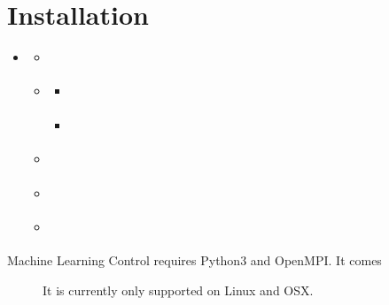 \documentclass[letterpaper,10pt,english]{sphinxmanual}
\begin{document}
\chapter{Installation}
\label{\detokenize{user/installation:installation}}\label{\detokenize{user/installation::doc}}
\begin{sphinxShadowBox}
\begin{itemize}
\item {} 
\label{\detokenize{user/installation:id1}}{\hyperref[\detokenize{user/installation:installation}]{}}
\begin{itemize}
\item {} 
\label{\detokenize{user/installation:id2}}{\hyperref[\detokenize{user/installation:installing-python}]{}}

\item {} 
\label{\detokenize{user/installation:id3}}{\hyperref[\detokenize{user/installation:installing-openmpi}]{}}
\begin{itemize}
\item {} 
\label{\detokenize{user/installation:id4}}{\hyperref[\detokenize{user/installation:ubuntu}]{}}

\item {} 
\label{\detokenize{user/installation:id5}}{\hyperref[\detokenize{user/installation:mac-os-x}]{}}

\end{itemize}

\item {} 
\label{\detokenize{user/installation:id6}}{\hyperref[\detokenize{user/installation:installing-spinning-up}]{}}

\item {} 
\label{\detokenize{user/installation:id7}}{\hyperref[\detokenize{user/installation:check-your-install}]{}}

\item {} 
\label{\detokenize{user/installation:id8}}{\hyperref[\detokenize{user/installation:installing-mujoco-optional}]{}}

\end{itemize}

\end{itemize}
\end{sphinxShadowBox}
\begin{description}
\item[{Machine Learning Control requires Python3 and OpenMPI. It comes}] \leavevmode
It is currently only supported on Linux and OSX.

\end{description}
\end{document}
